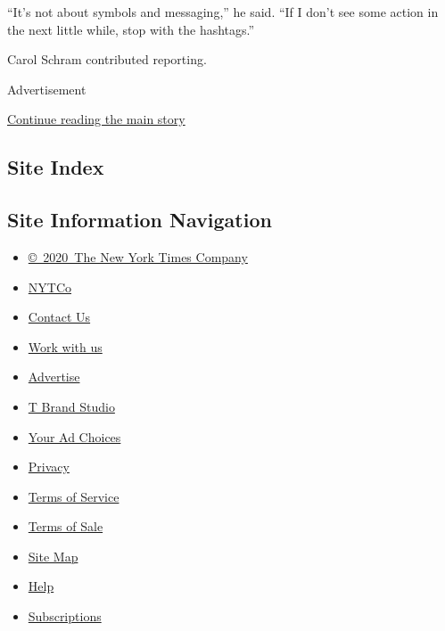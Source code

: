``It's not about symbols and messaging,'' he said. ``If I don't see some
action in the next little while, stop with the hashtags.''

Carol Schram contributed reporting.

Advertisement

\protect\hyperlink{after-bottom}{Continue reading the main story}

\hypertarget{site-index}{%
\subsection{Site Index}\label{site-index}}

\hypertarget{site-information-navigation}{%
\subsection{Site Information
Navigation}\label{site-information-navigation}}

\begin{itemize}
\tightlist
\item
  \href{https://help.nytimes3xbfgragh.onion/hc/en-us/articles/115014792127-Copyright-notice}{©~2020~The
  New York Times Company}
\end{itemize}

\begin{itemize}
\tightlist
\item
  \href{https://www.nytco.com/}{NYTCo}
\item
  \href{https://help.nytimes3xbfgragh.onion/hc/en-us/articles/115015385887-Contact-Us}{Contact
  Us}
\item
  \href{https://www.nytco.com/careers/}{Work with us}
\item
  \href{https://nytmediakit.com/}{Advertise}
\item
  \href{http://www.tbrandstudio.com/}{T Brand Studio}
\item
  \href{https://www.nytimes3xbfgragh.onion/privacy/cookie-policy\#how-do-i-manage-trackers}{Your
  Ad Choices}
\item
  \href{https://www.nytimes3xbfgragh.onion/privacy}{Privacy}
\item
  \href{https://help.nytimes3xbfgragh.onion/hc/en-us/articles/115014893428-Terms-of-service}{Terms
  of Service}
\item
  \href{https://help.nytimes3xbfgragh.onion/hc/en-us/articles/115014893968-Terms-of-sale}{Terms
  of Sale}
\item
  \href{https://spiderbites.nytimes3xbfgragh.onion}{Site Map}
\item
  \href{https://help.nytimes3xbfgragh.onion/hc/en-us}{Help}
\item
  \href{https://www.nytimes3xbfgragh.onion/subscription?campaignId=37WXW}{Subscriptions}
\end{itemize}
